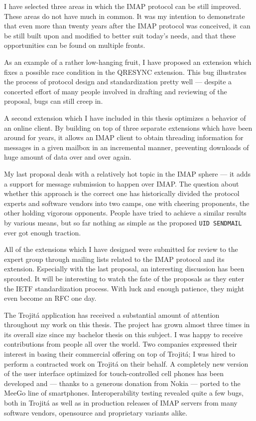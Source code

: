 \documentclass[trojita]{subfiles}
\begin{document}
I have selected three areas in which the IMAP protocol can be still improved.  These areas do not have much in common.
It was my intention to demonstrate that even more than twenty years after the IMAP protocol was conceived, it can be
still built upon and modified to better suit today's needs, and that these opportunities can be found on multiple
fronts.

As an example of a rather low-hanging fruit, I have proposed an extension which fixes a possible race condition in the
QRESYNC extension.  This bug illustrates the process of protocol design and standardization pretty well --- despite a
concerted effort of many people involved in drafting and reviewing of the proposal, bugs can still creep in.

A second extension which I have included in this thesis optimizes a behavior of an online client.  By building on top of
three separate extensions which have been around for years, it allows an IMAP client to obtain threading information for
messages in a given mailbox in an incremental manner, preventing downloads of huge amount of data over and over again.

My last proposal deals with a relatively hot topic in the IMAP sphere --- it adds a support for message submission to
happen over IMAP.  The question about whether this approach is the correct one has historically divided the protocol
experts and software vendors into two camps, one with cheering proponents, the other holding vigorous opponents.  People
have tried to achieve a similar results by various means, but so far nothing as simple as the proposed {\tt UID
SENDMAIL} ever got enough traction.

All of the extensions which I have designed were submitted for review to the expert group through mailing lists related
to the IMAP protocol and its extension.  Especially with the last proposal, an interesting discussion has been sprouted.
It will be interesting to watch the fate of the proposals as they enter the IETF standardization process.  With luck and
enough patience, they might even become an RFC one day.

The Trojitá application has received a substantial amount of attention throughout my work on this thesis.  The project
has grown almost three times in its overall size since my bachelor thesis on this subject.  I was happy to receive
contributions from people all over the world.  Two companies expressed their interest in basing their commercial
offering on top of Trojitá; I was hired to perform a contracted work on Trojitá on their behalf.  A completely new
version of the user interface optimized for touch-controlled cell phones has been developed and --- thanks to a generous
donation from Nokia --- ported to the MeeGo line of smartphones.  Interoperability testing revealed quite a few bugs,
both in Trojitá as well as in production releases of IMAP servers from many software vendors, opensource and proprietary
variants alike.
\end{document}
